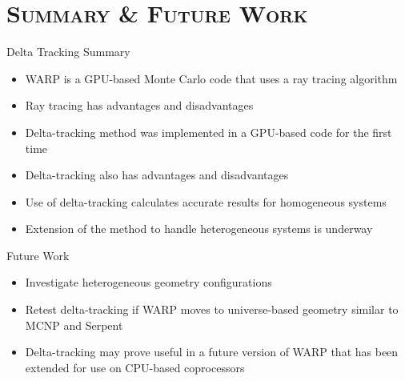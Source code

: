 \documentclass[xcolor=x11names, compress]{beamer}
\renewcommand{\(}{\begin{columns}}
\renewcommand{\)}{\end{columns}}
\newcommand{\<}[1]{\begin{column}{#1}}
\renewcommand{\>}{\end{column}}
\begin{document}
\section{\scshape Summary \& Future Work}
\begin{frame}{Delta Tracking Summary}
	\begin{itemize}
	\item{WARP is a GPU-based Monte Carlo code that uses a ray tracing algorithm}
	\item{Ray tracing has advantages and disadvantages}
	\pause\
	\vspace*{1 em}
	\item{Delta-tracking method was implemented in a GPU-based code for the first time}
	\item{Delta-tracking also has advantages and disadvantages}
	\pause
	\vspace*{1 em}
	\item{Use of delta-tracking calculates accurate results for homogeneous systems}
	\item{Extension of the method to handle heterogeneous systems is underway}
	\end{itemize}
\end{frame}


\begin{frame}{Future Work}
	\begin{itemize}
	\item{Investigate heterogeneous geometry configurations}
	\pause
	\item{Retest delta-tracking if WARP moves to universe-based geometry similar to MCNP and Serpent}
	\pause
	\item{Delta-tracking may prove useful in a future version of WARP that has been extended for use 
	on CPU-based coprocessors}
	\end{itemize}
\end{frame}
\end{document}

